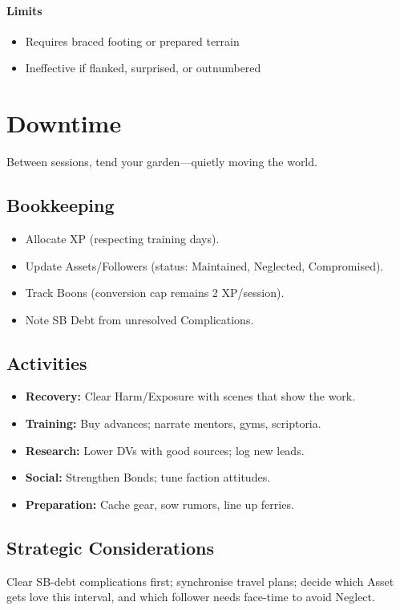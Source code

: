 \paragraph{Limits}
\begin{itemize}
  \item Requires braced footing or prepared terrain
  \item Ineffective if flanked, surprised, or outnumbered
\end{itemize}

\section{Downtime}

Between sessions, tend your garden---quietly moving the world.

\subsection{Bookkeeping}
\begin{itemize}
  \item Allocate XP (respecting training days).
  \item Update Assets/Followers (status: Maintained, Neglected, Compromised).
  \item Track Boons (conversion cap remains 2 XP/session).
  \item Note SB Debt from unresolved Complications.
\end{itemize}

\subsection{Activities}
\begin{itemize}
  \item \textbf{Recovery:} Clear Harm/Exposure with scenes that show the work.
  \item \textbf{Training:} Buy advances; narrate mentors, gyms, scriptoria.
  \item \textbf{Research:} Lower DVs with good sources; log new leads.
  \item \textbf{Social:} Strengthen Bonds; tune faction attitudes.
  \item \textbf{Preparation:} Cache gear, sow rumors, line up ferries.
\end{itemize}

\subsection{Strategic Considerations}
Clear SB-debt complications first; synchronise travel plans; decide which Asset gets love this interval, and which follower needs face-time to avoid Neglect.


